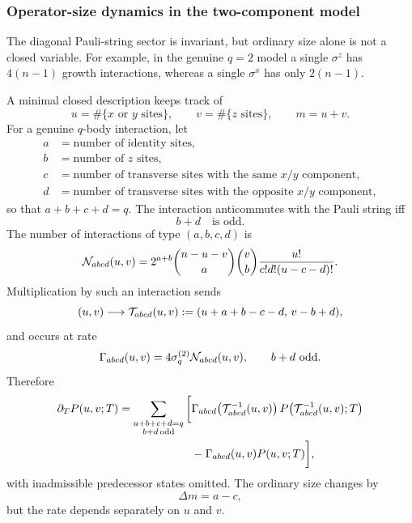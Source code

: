 \documentclass{article}
\theoremstyle{definition}
\begin{document}
\subsubsection{Operator-size dynamics in the two-component model}

The diagonal Pauli-string sector is invariant, but ordinary size alone is
not a closed variable.  For example, in the genuine $q=2$ model a single
$\sigma^z$ has $4(n-1)$ growth interactions, whereas a single $\sigma^x$
has only $2(n-1)$.

A minimal closed description keeps track of
\begin{equation}
    u=\#\{x\text{ or }y\text{ sites}\},
    \qquad
    v=\#\{z\text{ sites}\},
    \qquad
    m=u+v.
\end{equation}
For a genuine $q$-body interaction, let
\begin{align}
    a&=\text{number of identity sites},\nonumber\\
    b&=\text{number of $z$ sites},\nonumber\\
    c&=\text{number of transverse sites with the same $x/y$ component},
    \nonumber\\
    d&=\text{number of transverse sites with the opposite $x/y$ component},
\end{align}
so that $a+b+c+d=q$.  The interaction anticommutes with the Pauli string
iff
\begin{equation}
    b+d\quad\text{is odd}.
\end{equation}
The number of interactions of type $(a,b,c,d)$ is
\begin{equation}
    {\cal N}_{abcd}(u,v)
    =2^{a+b}
      \binom{n-u-v}{a}\binom vb
      \frac{u!}{c!d!(u-c-d)!}.
\end{equation}
Multiplication by such an interaction sends
\begin{equation}
    (u,v)\longrightarrow
    {\cal T}_{abcd}(u,v)
    :=(u+a+b-c-d,\,v-b+d),
\end{equation}
and occurs at rate
\begin{equation}
    \Gamma_{abcd}(u,v)
    =4\sigma_q^{(2)}{\cal N}_{abcd}(u,v),
    \qquad b+d\ \text{odd}.
\end{equation}
Therefore
\begin{align}
    \partial_TP(u,v;T)
    =\sum_{\substack{a+b+c+d=q\\b+d\,\text{odd}}}
    \bigg[&
       \Gamma_{abcd}\!\left({\cal T}_{abcd}^{-1}(u,v)\right)
       P\!\left({\cal T}_{abcd}^{-1}(u,v);T\right)
       \nonumber\\
       &-\Gamma_{abcd}(u,v)P(u,v;T)
    \bigg],
\end{align}
with inadmissible predecessor states omitted.  The ordinary size changes by
\begin{equation}
    \Delta m=a-c,
\end{equation}
but the rate depends separately on $u$ and $v$.
\end{document}
